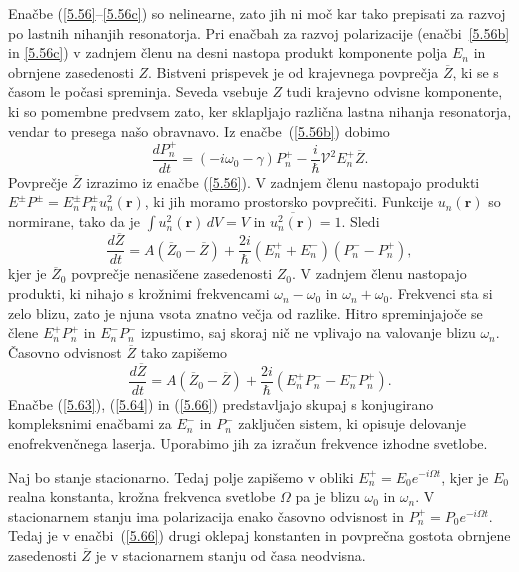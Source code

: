 Enačbe (\ref{5.56}--\ref{5.56c}) so nelinearne, zato jih ni moč kar tako
prepisati za razvoj po lastnih nihanjih resonatorja. Pri enačbah za
razvoj polarizacije (enačbi~\ref{5.56b} in \ref{5.56c}) v zadnjem členu na desni 
nastopa produkt komponente polja $E_n$ in obrnjene zasedenosti $Z$. Bistveni
prispevek je od krajevnega povprečja $\overline{Z}$, ki se s časom le počasi spreminja.
Seveda vsebuje $Z$ tudi krajevno odvisne komponente, ki so pomembne 
predvsem zato, ker sklapljajo različna lastna nihanja resonatorja, vendar to
presega našo obravnavo. Iz enačbe~(\ref{5.56b}) dobimo
\begin{equation}  
\label{5.64}
\frac{d P_n^+}{dt}=\left(-i \omega_0-\gamma\right)P_n^{+}-\frac{i}{\hbar}
\mathcal{V}^2 E_n^+ \overline{Z}.
\end{equation}
Povprečje $\overline{Z}$ izrazimo iz enačbe (\ref{5.56}). V zadnjem členu nastopajo produkti 
$E^{\pm}P^{\pm}=E_n^{\pm}P_n^{\pm} u_n^2\left(\mathbf{r}\right)$,
ki jih moramo prostorsko povprečiti. Funkcije $u_n\left(\mathbf{r}\right)$ so
normirane, tako da je $\int u_n^2\left(\mathbf{r}\right) \,dV=V$ in $\overline{u_n^2\left(\mathbf{r}\right)}=1$.
Sledi
\begin{equation}  
\label{5.65}
\frac{d\overline{Z}}{dt}= A\left(\overline{Z}_0-\overline{Z}\right)+ \frac{2i}{\hbar}\left(E_n^+
+E_n^-\right)\left(P_n^- - P_n^+\right),
\end{equation}
kjer je $\overline{Z}_0$ povprečje nenasičene zasedenosti $Z_0$. V zadnjem
členu nastopajo produkti, ki nihajo s krožnimi frekvencami $\omega_n-
\omega_0$ in $\omega_n+ \omega_0$. Frekvenci sta si zelo blizu,
zato je njuna vsota znatno večja od razlike. Hitro spreminjajoče se člene 
$E_n^+P_n^+$ in $E_n^- P_n^-$ izpustimo, 
saj skoraj nič ne vplivajo na valovanje blizu $\omega_n$. Časovno odvisnost 
$\overline{Z}$ tako zapišemo 
\begin{equation}  
\label{5.66}
\frac{d\overline{Z}}{dt}= A\left(\overline{Z}_0-\overline{Z}\right)+\frac{2i}{\hbar}\left(E_n^+
P_n^- - E_n^- P_n^+\right).
\end{equation}
Enačbe (\ref{5.63}), (\ref{5.64}) in (\ref{5.66}) predstavljajo skupaj s konjugirano
kompleksnimi enačbami za $E_n^-$ in $P_n^-$ zaključen
sistem, ki opisuje delovanje enofrekvenčnega laserja. Uporabimo jih za
izračun frekvence izhodne svetlobe.

Naj bo stanje stacionarno. Tedaj polje zapišemo v obliki $E_{n
}^{+}=E_{0}e^{-i\Omega t}$, kjer je $E_{0}$ realna konstanta, krožna frekvenca
svetlobe $\Omega$ pa je blizu $\omega _{0}$ in $\omega _{n }$. V
stacionarnem stanju ima polarizacija enako časovno odvisnost in 
$P_{n }^{+}=P_{0}e^{-i\Omega t}$. Tedaj je v enačbi~(\ref{5.66}) drugi
oklepaj konstanten in povprečna gostota obrnjene zasedenosti $\overline{Z}$ je 
v stacionarnem stanju od časa neodvisna. 


